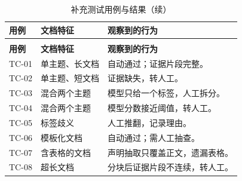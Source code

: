 \begin{longtable}{|>{\raggedright\arraybackslash}p{2.4cm}|>{\raggedright\arraybackslash}p{4.2cm}|>{\raggedright\arraybackslash}p{6.0cm}|}
  \caption{补充测试用例与结果}\label{tab:test-cases}\\
  \hline
  \textbf{用例} & \textbf{文档特征} & \textbf{观察到的行为} \\ \hline
  \endfirsthead
  \caption[]{补充测试用例与结果（续）}\\
  \hline
  \textbf{用例} & \textbf{文档特征} & \textbf{观察到的行为} \\ \hline
  \endhead
  TC-01 & 单主题、长文档 & 自动通过；证据片段完整。 \\ \hline
  TC-02 & 单主题、短文档 & 证据缺失，转人工。 \\ \hline
  TC-03 & 混合两个主题 & 模型只给一个标签，人工拆分。 \\ \hline
  TC-04 & 混合两个主题 & 模型分数接近阈值，转人工。 \\ \hline
  TC-05 & 标签歧义 & 人工推翻，记录理由。 \\ \hline
  TC-06 & 模板化文档 & 自动通过；需人工抽查。 \\ \hline
  TC-07 & 含表格的文档 & 声明抽取只覆盖正文，遗漏表格。 \\ \hline
  TC-08 & 超长文档 & 分块后证据片段不连续，转人工。 \\ \hline
\end{longtable}
